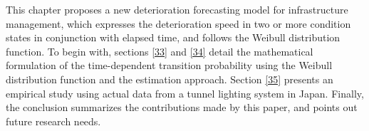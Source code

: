 This chapter proposes a new deterioration forecasting model for infrastructure management, which expresses the deterioration speed in two or more condition states in conjunction with elapsed time,  and follows the Weibull distribution function. To begin with, sections \ref{33} and \ref{34} detail the mathematical formulation of the time-dependent transition probability using the Weibull distribution function and the estimation approach. Section \ref{35} presents an empirical study using actual data from a tunnel lighting system in Japan. Finally, the conclusion summarizes the contributions made by this paper, and points out future research needs.
%
%
